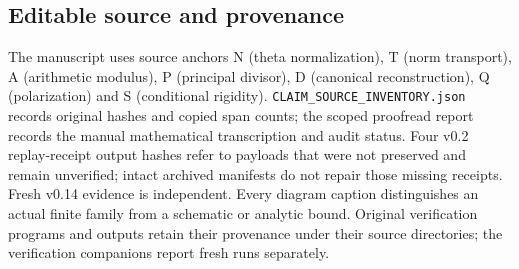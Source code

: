 \subsection{Editable source and provenance}
The manuscript uses source anchors N (theta normalization), T (norm transport), A (arithmetic modulus), P (principal divisor), D (canonical reconstruction), Q (polarization) and S (conditional rigidity). \texttt{CLAIM\_SOURCE\_INVENTORY.json} records original hashes and copied span counts; the scoped proofread report records the manual mathematical transcription and audit status. Four v0.2 replay-receipt output hashes refer to payloads that were not preserved and remain unverified; intact archived manifests do not repair those missing receipts. Fresh v0.14 evidence is independent. Every diagram caption distinguishes an actual finite family from a schematic or analytic bound. Original verification programs and outputs retain their provenance under their source directories; the verification companions report fresh runs separately.
